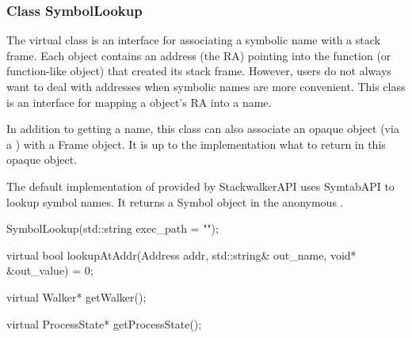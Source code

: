 \subsubsection{Class SymbolLookup}

The  virtual class is an interface for associating a symbolic
name with a stack frame. Each  object contains an address (the RA)
pointing into the function (or function-like object) that created its stack
frame. However, users do not always want to deal with addresses when symbolic
names are more convenient. This class is an interface for mapping a  object's RA into a name.

In addition to getting a name, this class can also associate an opaque object
(via a ) with a Frame object. It is up to the 
implementation what to return in this opaque object.

The default implementation of  provided by StackwalkerAPI
uses SymtabAPI to lookup symbol names. It returns a Symbol
object in the anonymous .

\begin{apient}
SymbolLookup(std::string exec_path = "");
\end{apient}

\begin{apient}
virtual bool lookupAtAddr(Address addr,
                          std::string& out_name,
                          void* &out_value) = 0;
\end{apient}

\begin{apient}
virtual Walker* getWalker();
\end{apient}

\begin{apient}
virtual ProcessState* getProcessState();
\end{apient}


